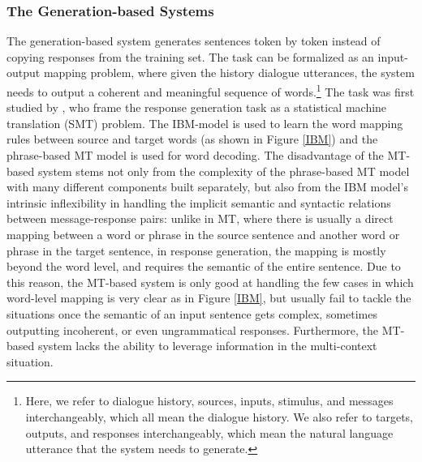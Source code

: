 \subsubsection{The Generation-based Systems}
The generation-based system generates sentences token by token instead of  copying responses from the training set. The task can be formalized 
as an input-output mapping problem, where given the history dialogue utterances, the system needs to output a coherent and meaningful sequence of words.\footnote{Here, we refer to dialogue history, sources, inputs, stimulus,
and messages interchangeably, which all mean the dialogue history. We also refer to targets, outputs, and responses interchangeably, which mean the natural language utterance that the system needs to generate.}
The task was first studied by ,  who frame the response generation task as a
statistical machine translation (SMT) problem. The IBM-model \cite{brown1991aligning} is used  to learn the  word mapping rules between source  and target words (as shown in Figure \ref{IBM}) and the phrase-based MT model \cite{chiang2007hierarchical} is used for word decoding. The disadvantage of the MT-based system stems not only from the  complexity of the phrase-based MT model with many different components built separately, but also from the IBM model's intrinsic inflexibility in handling 
the 
implicit semantic and syntactic
relations between message-response pairs: unlike in MT, where there is usually a direct mapping between a word or phrase in the source sentence and another 
word or phrase
in the target sentence, 
in response generation, the  mapping is mostly beyond the word level, and 
 requires the semantic of the entire sentence. 
Due to this reason, the MT-based system is only good at handling the few cases in which word-level mapping is very clear as in Figure \ref{IBM}, but usually
fail to tackle
  the situations once the semantic of an input sentence gets  complex, sometimes outputting incoherent, or even ungrammatical responses. 
Furthermore, the MT-based system lacks the ability to leverage information in the multi-context situation. 

